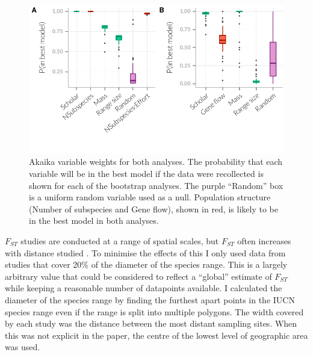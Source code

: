\begin{knitrout}\footnotesize
{}\color{fgcolor}\begin{figure}[t]

{\centering \includegraphics[width=\textwidth,trim = 0 1cm 0 0]{figure/fstITPlots-1} 

}

\caption[Akaika variable weights for $F_{ST}$ analysis.]{Akaika variable weights for both analyses. The probability that each variable will be in the best model if the data were recollected is shown for each of the bootstrap analyses. The purple ``Random'' box is a uniform random variable used as a null. Population structure (Number of subspecies and Gene flow), shown in red, is likely to be in the best model in both analyses.}\label{fig:fstITPlots}
\end{figure}


\end{knitrout}
















$F_{ST}$ studies are conducted at a range of spatial scales, but $F_{ST}$ often increases with distance studied \cite{burland1999population, hulva2010mechanisms, o2015genetic, vonhof2015range}.
To minimise the effects of this I only used data from studies that cover 20\% of the diameter of the species range.
This is a largely arbitrary value that could be considered to reflect a ``global'' estimate of $F_{ST}$ while keeping a reasonable number of datapoints available.
I calculated the diameter of the species range by finding the furthest apart points in the IUCN species range \cite{iucn} even if the range is split into multiple polygons.
The width covered by each study was the distance between the most distant sampling sites.
When this was not explicit in the paper, the centre of the lowest level of geographic area was used.



